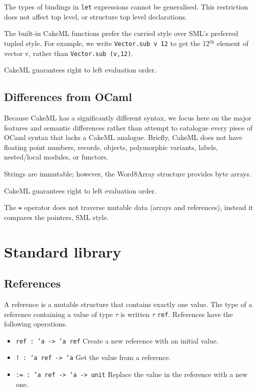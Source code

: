 \documentclass[12pt,a4paper]{book}
\begin{document}
The types of bindings in \texttt{let} expressions cannot be generalised. This restriction does not affect top level, or structure top level declarations.

The built-in CakeML functions prefer the curried style over SML's preferred tupled style. For example, we write \texttt{Vector.sub v 12} to get the 12$^\textrm{th}$ element of vector v, rather than \texttt{Vector.sub (v,12)}.

CakeML guarantees right to left evaluation order.

\section{Differences from OCaml}

Because CakeML has a significantly different syntax, we focus here on the major features and semantic differences rather than attempt to catalogue every piece of OCaml syntax that lacks a CakeML analogue. Briefly, CakeML does not have floating point numbers, records, objects, polymorphic variants, labels, nested/local modules, or functors.

Strings are immutable; however, the Word8Array structure provides byte arrays.

CakeML guarantees right to left evaluation order.

The \texttt{=} operator does not traverse mutable data (arrays and references), instead it compares the pointers, SML style.

\chapter{Standard library}
\label{ch:stdlib}



\section{References}

A reference is a mutable structure that contains exactly one value. The type of a reference containing a value of type $\tau$ is written $\tau$ \texttt{ref}.
References have the following operations.
\begin{itemize}
\item
\texttt{ref : 'a -> 'a ref} Create a new reference with an initial value.
\item
\texttt{! : 'a ref -> 'a} Get the value from a reference.
\item
\texttt{:= : 'a ref -> 'a -> unit} Replace the value in the reference with a new one.
\end{itemize}
\end{document}
